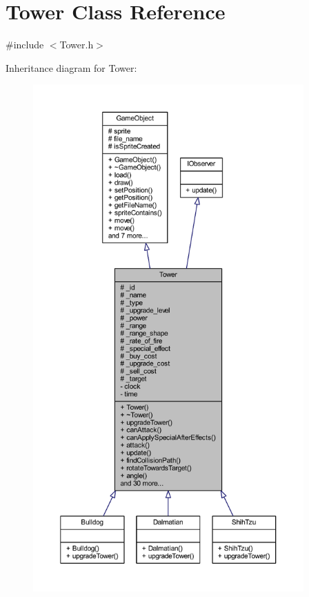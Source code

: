\hypertarget{class_tower}{\section{Tower Class Reference}
\label{class_tower}
}


{\ttfamily \#include $<$Tower.\+h$>$}



Inheritance diagram for Tower\+:
\nopagebreak
\begin{figure}[H]
\begin{center}
\leavevmode
\includegraphics[height=550pt]{class_tower__inherit__graph}
\end{center}
\end{figure}


